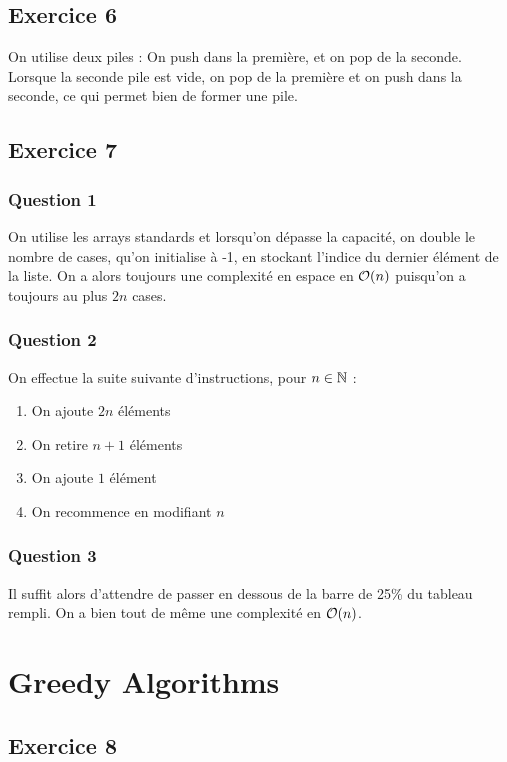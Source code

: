 \documentclass{cours}
\begin{document}
\subsection{Exercice 6}
On utilise deux piles : On push dans la première, et on pop de la seconde. Lorsque la seconde pile est vide, on pop de la première et on push dans la seconde, ce qui permet bien de former une pile. 

\subsection{Exercice 7}
\subsubsection{Question 1}
On utilise les arrays standards et lorsqu'on dépasse la capacité, on double le nombre de cases, qu'on initialise à -1, en stockant l'indice du dernier élément de la liste. On a alors toujours une complexité en espace en $\mathcal{O}(n)$ puisqu'on a toujours au plus $2n$ cases. \\

\subsubsection{Question 2}
On effectue la suite suivante d'instructions, pour $n \in \mathbb{N}$ : \begin{enumerate}
    \item On ajoute $2n$ éléments
    \item On retire $n+1$ éléments
    \item On ajoute $1$ élément
    \item On recommence en modifiant $n$
\end{enumerate}

\subsubsection{Question 3}
Il suffit alors d'attendre de passer en dessous de la barre de 25\% du tableau rempli. On a bien tout de même une complexité en $\mathcal{O}(n)$.

 \section{Greedy Algorithms}
\subsection{Exercice 8}
\end{document}
